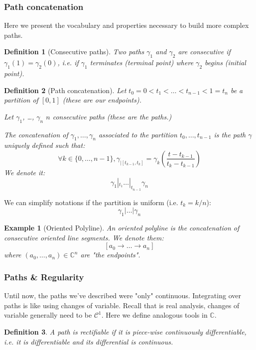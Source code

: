 \documentclass{article}
\newtheorem*{defi}{Definition}
\newtheorem*{example}{Example}
\begin{document}
\subsubsection{Path concatenation}

Here we present the vocabulary and properties necessary to build more complex paths.
\begin{defi}[Consecutive paths]
    Two paths $\gamma_1$ and $\gamma_2$ are consecutive if $\gamma_1(1) = \gamma_2(0)$, i.e. if $\gamma_1$ terminates (terminal point) where $\gamma_2$ begins (initial point).
\end{defi}

\begin{defi}[Path concatenation]
    Let $t_0=0 < t_1 < \dots < t_{n-1} < 1=t_n $ be a partition of $[0,1]$ (these are our endpoints).

    Let $\gamma_1$, \dots, $\gamma_n$ $n$ consecutive paths (these are the paths.)

    The concatenation of $\gamma_1, \dots, \gamma_n$ associated to the partition $t_0, \dots, t_{n-1}$ is the path $\gamma$ uniquely defined such that:
    $$ \boxed{\forall k \in \lbrace0, \dots, n-1\rbrace, \gamma_{|[t_{k-1}, t_{k}]}= \gamma_k\left( \frac{t-t_{k-1}}{t_k - t_{k-1}} \right)}$$
    We denote it:
    $$ \gamma_1 |_{t_1} \dots |_{t_{n-1}} \gamma_n$$
\end{defi}

We can simplify notations if the partition is uniform (i.e. $t_k = k/n$):
    $$ \gamma_1 | \dots | \gamma_n$$

\begin{example}[Oriented Polyline]
    An oriented polyline is the concatenation of consecutive oriented line segments. We denote them:
    $$[a_0 \rightarrow \dots \rightarrow a_n]$$
    where $(a_0, \dots, a_n)\in\mathbb{C}^n$ are "the endpoints".
\end{example}

\subsubsection{Paths \& Regularity}

Until now, the paths we've described were "only" continuous. Integrating over paths is like using changes of variable. Recall that is real analysis, changes of variable generally need to be $\mathcal{C}^1$. Here we define analogous tools in $\mathbb{C}$.

\begin{defi}
    A path is rectifiable if it is piece-wise continuously differentiable, i.e. it is differentiable and its differential is continuous.
\end{defi}
\end{document}
